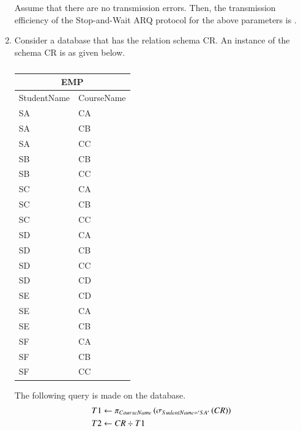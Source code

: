 \documentclass[a4paper, 11pt]{article}
\begin{document}
\begin{enumerate}
    Assume that there are no transmission errors. Then, the transmission efficiency  of the Stop-and-Wait ARQ protocol for the above parameters is \underline{\hspace{2cm}} .

    \hfill{}
    \newpage

    \item Consider a database that has the relation schema CR. An instance of the schema CR is as given below.
    
    \begin{table}[h]
        \centering
        \begin{tabular}{|l|l|}
            \hline
            \multicolumn{2}{|c|}{EMP}\\
            \hline
            StudentName & CourseName \\
            \hline
            SA & CA \\
            SA & CB \\
            SA & CC \\
            SB & CB \\
            SB & CC \\
            SC & CA \\
            SC & CB \\
            SC & CC \\
            SD & CA \\
            SD & CB \\
            SD & CC \\
            SD & CD \\
            SE & CD \\
            SE & CA \\
            SE & CB \\
            SF & CA \\
            SF & CB \\
            SF & CC \\
            \hline
        \end{tabular}
        \caption*{}
        \label{tab:46}
    \end{table}

    The following query is made on the database.
    \begin{align*}
        T1 &\leftarrow \pi_{CourseName}\left(\sigma_{SudentName='SA'}\left(CR\right)\right) \\
        T2 &\leftarrow CR \div T1
    \end{align*}
    

\end{enumerate}
\end{document}
